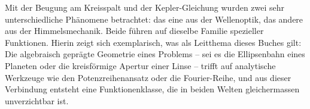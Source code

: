 Mit der Beugung am Kreisspalt und der Kepler-Gleichung wurden zwei sehr unterschiedliche Phänomene betrachtet: das eine aus der Wellenoptik, das andere aus der Himmelsmechanik.
Beide führen auf dieselbe Familie spezieller Funktionen.
Hierin zeigt sich exemplarisch, was als Leitthema dieses Buches gilt: Die algebraisch geprägte Geometrie eines Problems -- sei es die Ellipsenbahn eines Planeten oder die kreisförmige Apertur einer Linse -- trifft auf analytische Werkzeuge wie den Potenzreihenansatz oder die Fourier-Reihe, und aus dieser Verbindung entsteht eine Funktionenklasse, die in beiden Welten gleichermassen unverzichtbar ist.

